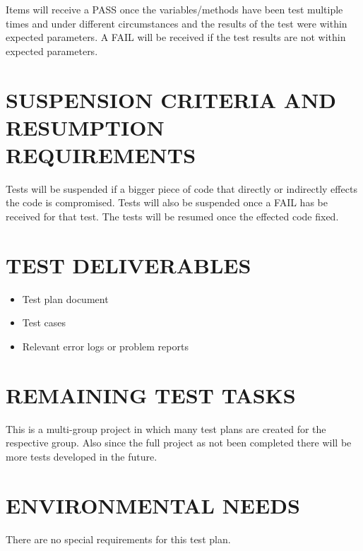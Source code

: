 {{{\color{black}
Items will receive a PASS once the variables/methods have been test multiple times and under different circumstances and the results of the test were within expected parameters. A FAIL will be received if the test results are not within expected parameters. 
}

\section[SUSPENSION CRITERIA]{\bfseries\color{black}
	 SUSPENSION CRITERIA AND RESUMPTION REQUIREMENTS}
{\itshape\color{black}

{\color{black}
Tests will be suspended if a bigger piece of code that directly or indirectly effects the code is compromised. Tests will also be suspended once a FAIL has be received for that test. The tests will be resumed once the effected code fixed. 
}

\section[TEST DELIVERABLES]{\bfseries\color{black} TEST DELIVERABLES}

{\color{black}
\begin{itemize}
\item Test plan document
\item Test cases
\item Relevant error logs or problem reports
\end{itemize}
}

\section[REMAINING TEST TASKS]{\bfseries\color{black} REMAINING TEST TASKS}

{\color{black}
This is a multi-group project in which many test plans are created for the respective group. Also since the full project as not been completed there will be more tests developed in the future. 
}

\section[ENVIRONMENTAL NEEDS]{\bfseries\color{black} ENVIRONMENTAL NEEDS}

{\color{black}
There are no special requirements for this test plan. 
}

}}}
